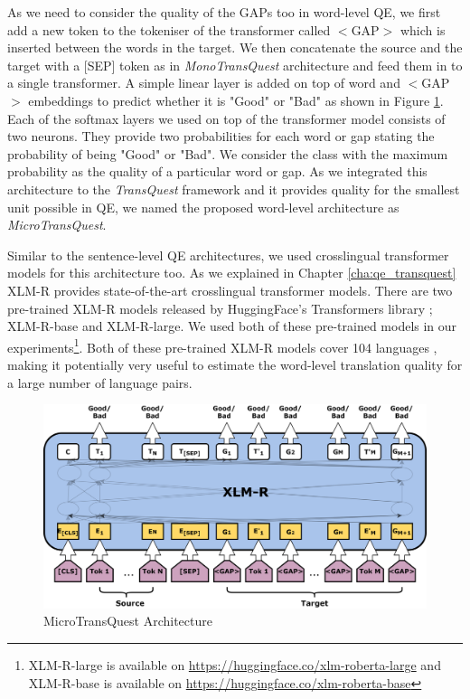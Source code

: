As we need to consider the quality of the GAPs too in word-level QE, we first add a new token to the tokeniser of the transformer called \textsc{$<$GAP$>$} which is inserted between the words in the target. We then concatenate the source and the target with a \textsc{[SEP]} token as in \textit{MonoTransQuest} architecture and feed them in to a single transformer. A simple linear layer is added on top of word and {$<$GAP$>$} embeddings to predict whether it is "Good" or "Bad" as shown in Figure \ref{fig:word_level_architecture}. Each of the softmax layers we used on top of the transformer model consists of two neurons. They provide two probabilities for each word or gap stating the probability of being "Good" or "Bad". We consider the class with the maximum probability as the quality of a particular word or gap. As we integrated this architecture to the \textit{TransQuest} framework and it provides quality for the smallest unit possible in QE, we named the proposed word-level architecture as \textit{MicroTransQuest}. 


Similar to the sentence-level QE architectures, we used crosslingual transformer models for this architecture too. As we explained in Chapter \ref{cha:qe_transquest} XLM-R provides state-of-the-art crosslingual transformer models. There are two pre-trained XLM-R models released by HuggingFace's Transformers library \cite{wolf-etal-2020-transformers}; XLM-R-base and XLM-R-large. We used both of these pre-trained models in our experiments\footnote{XLM-R-large is available on \url{https://huggingface.co/xlm-roberta-large} and XLM-R-base is available on \url{https://huggingface.co/xlm-roberta-base}}. Both of these pre-trained XLM-R models cover 104 languages \cite{conneau-etal-2020-unsupervised}, making it potentially very useful to estimate the word-level translation quality for a large number of language pairs.

\begin{figure}
	\centering
	\includegraphics[scale=0.7]{figures/translation_quality_estimation/word_level/MicroTransQuest.png}
	\caption{MicroTransQuest Architecture}
	\label{fig:word_level_architecture}
\end{figure}

